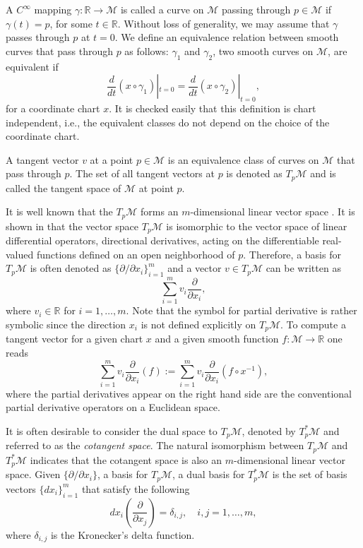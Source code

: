 A $C^{\infty}$ mapping $\gamma:\mathbb R \to \mathcal M$ is called a curve on $\mathcal M$ passing through $p\in \mathcal M$ if $\gamma(t) = p$, for some $t\in \mathbb R$. Without loss of generality, we may assume that $\gamma$ passes through $p$ at $t=0$. We define an equivalence relation between smooth curves that pass through $p$ as follows: $\gamma_1$ and $\gamma_2$, two smooth curves on $\mathcal M$, are equivalent if
\begin{equation} \label{eq:2.1}
	\frac{d}{dt}(x\circ \gamma_1)|_{t=0} = \frac{d}{dt}(x\circ \gamma_2)|_{t=0},
\end{equation}
for a coordinate chart $x$. It is checked easily that this definition is chart independent, i.e., the equivalent classes do not depend on the choice of the coordinate chart.
\begin{definition}
A tangent vector $v$ at a point $p\in \mathcal M$ is an equivalence class of curves on $\mathcal M$ that pass through $p$. The set of all tangent vectors at $p$ is denoted as $T_p\mathcal M$ and is called the tangent space of $\mathcal M$ at point $p$.
\end{definition}
It is well known that the $T_p\mathcal M$ forms an $m$-dimensional linear vector space \cite{robbin2011introduction}. It is shown in \cite{robbin2011introduction} that the vector space $T_p\mathcal M$ is isomorphic to the vector space of linear differential operators, directional derivatives, acting on the differentiable real-valued functions defined on an open neighborhood of $p$. Therefore, a basis for $T_p\mathcal M$ is often denoted as $\{ \partial /\partial x_i \}_{i=1}^{m}$ and a vector $v\in T_p\mathcal M$ can be written as 
\begin{equation}
	\sum_{i=1}^m v_i \frac{\partial}{\partial x_i},
\end{equation}
where $v_i\in \mathbb R$ for $i = 1,\dots,m$. Note that the symbol for partial derivative is rather symbolic since the direction $x_i$ is not defined explicitly on $T_p\mathcal M$. To compute a tangent vector for a given chart $x$ and a given smooth function $f:\mathcal M \to \mathbb R$ one reads
\begin{equation}
	\sum_{i=1}^m v_i \frac{\partial}{\partial x_i} (f) := \sum_{i=1}^m v_i \frac{\partial}{\partial x_i} (f \circ x^{-1}),
\end{equation}
where the partial derivatives appear on the right hand side are the conventional partial derivative operators on a Euclidean space.

It is often desirable to consider the dual space to $T_p\mathcal M$, denoted by $T_p^*\mathcal M$ and referred to as the \emph{cotangent space}. The natural isomorphism between $T_p\mathcal M$ and $T_p^*\mathcal M$ indicates that the cotangent space is also an $m$-dimensional linear vector space. Given $\{ \partial /\partial x_i \}$, a basis for $T_p\mathcal M$, a dual basis for $T_p^*\mathcal M$ is the set of basis vectors $\{ dx_i \}_{i=1}^{m}$ that satisfy the following
\begin{equation}
	dx_i(\frac{\partial}{\partial x_j}) = \delta_{i,j}, \quad i,j=1,\dots,m,
\end{equation}
where $\delta_{i,j}$ is the Kronecker's delta function.

